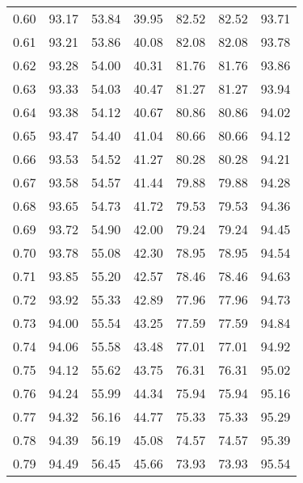 \begin{tabular}{|c|c|c|c|c|c|c|}
      0.60 &     93.17 &     53.84 &      39.95 &   82.52 &      82.52 &         93.71 \\
      0.61 &     93.21 &     53.86 &      40.08 &   82.08 &      82.08 &         93.78 \\
      0.62 &     93.28 &     54.00 &      40.31 &   81.76 &      81.76 &         93.86 \\
      0.63 &     93.33 &     54.03 &      40.47 &   81.27 &      81.27 &         93.94 \\
      0.64 &     93.38 &     54.12 &      40.67 &   80.86 &      80.86 &         94.02 \\
      0.65 &     93.47 &     54.40 &      41.04 &   80.66 &      80.66 &         94.12 \\
      0.66 &     93.53 &     54.52 &      41.27 &   80.28 &      80.28 &         94.21 \\
      0.67 &     93.58 &     54.57 &      41.44 &   79.88 &      79.88 &         94.28 \\
      0.68 &     93.65 &     54.73 &      41.72 &   79.53 &      79.53 &         94.36 \\
      0.69 &     93.72 &     54.90 &      42.00 &   79.24 &      79.24 &         94.45 \\
      0.70 &     93.78 &     55.08 &      42.30 &   78.95 &      78.95 &         94.54 \\
      0.71 &     93.85 &     55.20 &      42.57 &   78.46 &      78.46 &         94.63 \\
      0.72 &     93.92 &     55.33 &      42.89 &   77.96 &      77.96 &         94.73 \\
      0.73 &     94.00 &     55.54 &      43.25 &   77.59 &      77.59 &         94.84 \\
      0.74 &     94.06 &     55.58 &      43.48 &   77.01 &      77.01 &         94.92 \\
      0.75 &     94.12 &     55.62 &      43.75 &   76.31 &      76.31 &         95.02 \\
      0.76 &     94.24 &     55.99 &      44.34 &   75.94 &      75.94 &         95.16 \\
      0.77 &     94.32 &     56.16 &      44.77 &   75.33 &      75.33 &         95.29 \\
      0.78 &     94.39 &     56.19 &      45.08 &   74.57 &      74.57 &         95.39 \\
      0.79 &     94.49 &     56.45 &      45.66 &   73.93 &      73.93 &         95.54 \\

\end{tabular}
